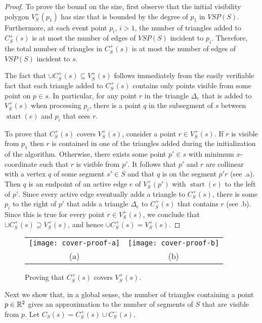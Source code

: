 \documentclass{patmorin}
\newcommand{\VSP}{\mathit{VSP}}
\DeclareMathOperator{\start}{start}
\begin{document}
\begin{proof}
To prove the bound on the size, first observe that the initial visibility
polygon $V^+_S(p_1)$ has size that is bounded by the degree of $p_1$ in
$\VSP(S)$.  Furthermore, at each event point $p_i$, $i>1$, the number of
triangles added to $C^+_S(s)$ is at most the number of edges of $\VSP(S)$
incident to $p_i$.  Therefore, the total number of triangles in $C^+_S(s)$
is at most the number of edges of $\VSP(S)$ incident to $s$.

The fact that $\cup C^+_S(s)\subseteq V^+_S(s)$ follows immediately from
the easily verifiable fact that each triangle added to $C^+_S(s)$ contains
only points visible from some point on $p\in s$.  In particular, for any
point $r$ in the triangle $\Delta_e$ that is added to $V^+_S(s)$ when
processing $p_i$, there is a point $q$ in the subsegment of $s$ between
$\start(e)$ and $p_i$ that sees $r$.

To prove that $C^+_S(s)$ covers $V^+_S(s)$, consider a point $r\in
V^+_S(s)$.  If $r$ is visible from $p_1$ then $r$ is contained in
one of the triangles added during the initialization of the algorithm.
Otherwise, there exists some point $p'\in s$ with minimum $x$-coordinate
such that $r$ is visible from $p'$.  It follows that $p'$ and $r$
are collinear with a vertex $q$ of some segment $s'\in S$ and that $q$
is on the segment $p'r$ (see .a).  Then $q$ is an
endpoint of an active edge $e$ of $V^+_S(p')$ with $\start(e)$ to the
left of $p'$.  Since every active edge eventually adds a triangle to
$C^+_S(s)$, there is some $p_i$ to the right of $p'$ that adds a triangle
$\Delta_e$ to $C^+_S(s)$ that contains $r$ (see .b).
Since this is true for every point $r\in V^+_S(s)$, we conclude that
$\cup C^+_S(s)\supseteq V^+_S(s)$, and hence $\cup C^+_S(s)= V^+_S(s)$.
\end{proof}

\begin{figure}
  \begin{center}
    \begin{tabular}{cc}
      \texttt{[image: cover-proof-a]} &
      \texttt{[image: cover-proof-b]} \\
      (a) & (b)
    \end{tabular}
  \end{center}
  \caption{Proving that $C^+_S(s)$ covers $V^+_S(s)$.}
\end{figure}

Next we show that, in a global sense, the number of triangles containing a
point $p\in\mathbb{R}^2$ gives an approximation to the number of segments of $S$
that are visible from $p$. Let $C_S(s) = C^+_S(s)\cup C^-_S(s)$.
\end{document}
